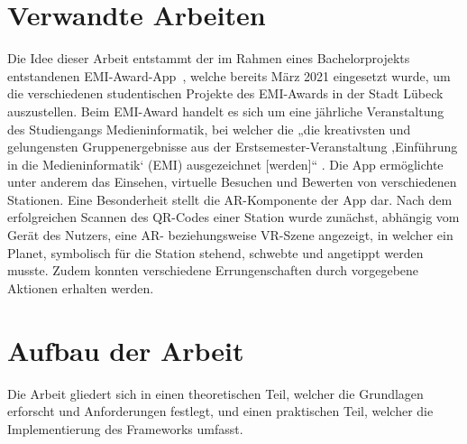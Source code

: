 \section{Verwandte Arbeiten}

Die Idee dieser Arbeit entstammt der im Rahmen eines Bachelorprojekts
entstandenen EMI-Award-App~\cite{Canzler2021}, welche bereits März 2021
eingesetzt wurde, um die verschiedenen studentischen Projekte des EMI-Awards in
der Stadt Lübeck auszustellen. Beim EMI-Award handelt es sich um eine jährliche
Veranstaltung des Studiengangs Medieninformatik, bei welcher die „die
kreativsten und gelungensten Gruppenergebnisse aus der
Erstsemester-Veranstaltung ‚Einführung in die Medieninformatik‘ (EMI)
ausgezeichnet [werden]“ \cite{UniversitatzuLubeck2021}. Die App ermöglichte
unter anderem das Einsehen, virtuelle Besuchen und Bewerten von verschiedenen
Stationen. Eine Besonderheit stellt die AR-Komponente der App dar. Nach dem
erfolgreichen Scannen des QR-Codes einer Station wurde zunächst, abhängig vom
Gerät des Nutzers, eine AR- beziehungsweise VR-Szene angezeigt, in welcher ein
Planet, symbolisch für die Station stehend, schwebte und angetippt werden
musste. Zudem konnten verschiedene Errungenschaften durch vorgegebene Aktionen
erhalten werden.

\section{Aufbau der Arbeit}

Die Arbeit gliedert sich in einen theoretischen Teil, welcher die Grundlagen
erforscht und Anforderungen festlegt, und einen praktischen Teil, welcher die
Implementierung des Frameworks umfasst.









